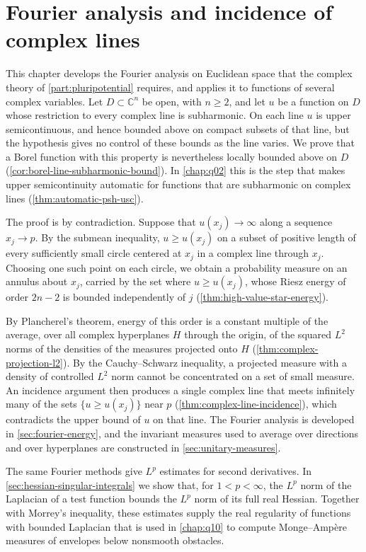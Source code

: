 \chapter{Fourier analysis and incidence of complex lines}
\label{chap:p06}

This chapter develops the Fourier analysis on Euclidean space that the complex theory of \cref{part:pluripotential} requires, and applies it to functions of several complex variables. Let $D\subset\mathbb C^n$ be open, with $n\geq2$, and let $u$ be a function on $D$ whose restriction to every complex line is subharmonic. On each line $u$ is upper semicontinuous, and hence bounded above on compact subsets of that line, but the hypothesis gives no control of these bounds as the line varies. We prove that a Borel function with this property is nevertheless locally bounded above on $D$ (\cref{cor:borel-line-subharmonic-bound}). In \cref{chap:q02} this is the step that makes upper semicontinuity automatic for functions that are subharmonic on complex lines (\cref{thm:automatic-psh-usc}).

The proof is by contradiction. Suppose that $u(x_j)\to\infty$ along a sequence $x_j\to p$. By the submean inequality, $u\geq u(x_j)$ on a subset of positive length of every sufficiently small circle centered at $x_j$ in a complex line through $x_j$. Choosing one such point on each circle, we obtain a probability measure on an annulus about $x_j$, carried by the set where $u\geq u(x_j)$, whose Riesz energy of order $2n-2$ is bounded independently of $j$ (\cref{thm:high-value-star-energy}).

By Plancherel's theorem, energy of this order is a constant multiple of the average, over all complex hyperplanes $H$ through the origin, of the squared $L^2$ norms of the densities of the measures projected onto $H$ (\cref{thm:complex-projection-l2}). By the Cauchy--Schwarz inequality, a projected measure with a density of controlled $L^2$ norm cannot be concentrated on a set of small measure. An incidence argument then produces a single complex line that meets infinitely many of the sets $\{u\geq u(x_j)\}$ near $p$ (\cref{thm:complex-line-incidence}), which contradicts the upper bound of $u$ on that line. The Fourier analysis is developed in \cref{sec:fourier-energy}, and the invariant measures used to average over directions and over hyperplanes are constructed in \cref{sec:unitary-measures}.

The same Fourier methods give $L^p$ estimates for second derivatives. In \cref{sec:hessian-singular-integrals} we show that, for $1<p<\infty$, the $L^p$ norm of the Laplacian of a test function bounds the $L^p$ norm of its full real Hessian. Together with Morrey's inequality, these estimates supply the real regularity of functions with bounded Laplacian that is used in \cref{chap:q10} to compute Monge--Amp\`ere measures of envelopes below nonsmooth obstacles.

